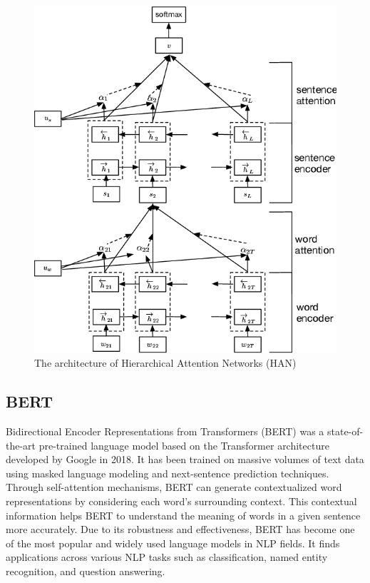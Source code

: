 \begin{figure}
    \centering
    \includegraphics[width=1\linewidth]{img/HAN.png}
    \caption{The architecture of Hierarchical Attention Networks (HAN)\cite{b20}}
    \label{fig:HAN}
\end{figure}

\subsection{BERT}
Bidirectional Encoder Representations from Transformers (BERT)\cite{b21} was a state-of-the-art pre-trained language model based on the Transformer\cite{b22} architecture developed by Google in 2018. It has been trained on massive volumes of text data using masked language modeling and next-sentence prediction techniques. Through self-attention mechanisms, BERT can generate contextualized word representations by considering each word's surrounding context. This contextual information helps BERT to understand the meaning of words in a given sentence more accurately. Due to its robustness and effectiveness, BERT has become one of the most popular and widely used language models in NLP fields. It finds applications across various NLP tasks such as classification, named entity recognition, and question answering.

